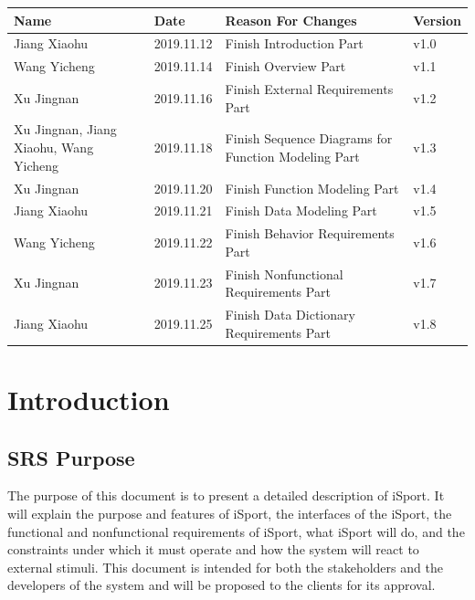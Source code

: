\documentclass[16pt]{scrreprt}
\begin{document}
\begin{center}
    \begin{tabular}{|p{5cm}|p{3cm}|p{7cm}|p{2cm}|}
        \hline
        Name & Date & Reason For Changes & Version\\
        \hline
        Jiang Xiaohu & 2019.11.12 & Finish Introduction Part  & v1.0\\
        \hline
        Wang Yicheng & 2019.11.14 & Finish Overview Part & v1.1\\
        \hline
        Xu Jingnan & 2019.11.16 & Finish External Requirements Part & v1.2\\
        \hline
        Xu Jingnan, Jiang Xiaohu, Wang Yicheng & 2019.11.18 & Finish Sequence Diagrams for Function Modeling Part& v1.3\\
        \hline
        Xu Jingnan & 2019.11.20 & Finish Function Modeling Part & v1.4\\
        \hline
        Jiang Xiaohu & 2019.11.21 & Finish Data Modeling Part  & v1.5\\
        \hline
        Wang Yicheng & 2019.11.22 & Finish Behavior Requirements Part & v1.6\\
        \hline
        Xu Jingnan & 2019.11.23 & Finish Nonfunctional Requirements Part & v1.7\\
        \hline
        Jiang Xiaohu & 2019.11.25 & Finish Data Dictionary Requirements Part & v1.8\\
        \hline
    \end{tabular}
\end{center}

\chapter{Introduction}

\section{SRS Purpose}
The purpose of this document is to present a detailed description of iSport. It will explain the purpose and features of iSport, the interfaces of the iSport, the functional and nonfunctional requirements of iSport, what iSport will do, and the constraints under which it must operate and how the system will react to external stimuli. This document is intended for both the stakeholders and the developers of the system and will be proposed to the clients for its approval.
\end{document}
